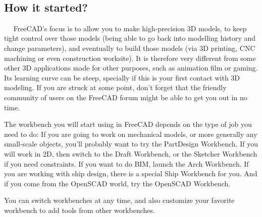 \
\
\

\subsection{How it started?}

\
\
FreeCAD's focus is to allow you to make high-precision 3D models, to keep 
tight control over those models (being able to go back into modelling history 
and change parameters), and eventually to build those models (via 3D printing, 
CNC machining or even construction worksite). It is therefore very different 
from some other 3D applications made for other purposes, such as animation 
film or gaming. Its learning curve can be steep, specially if this is 
your first contact with 3D modeling. If you are struck at some point, don't 
forget that the friendly community of users on the FreeCAD forum might be 
able to get you out in no time.

The workbench you will start using in FreeCAD depends on the type of job 
you need to do: If you are going to work on mechanical models, or more 
generally any small-scale objects, you'll probably want to try the PartDesign 
Workbench. If you will work in 2D, then switch to the Draft Workbench, or the 
Sketcher Workbench if you need constraints. If you want to do BIM, launch 
the Arch Workbench. If you are working with ship design, there is a special 
Ship Workbench for you. And if you come from the OpenSCAD world, try 
the OpenSCAD Workbench.

You can switch workbenches at any time, and also customize your favorite 
workbench to add tools from other workbenches.


